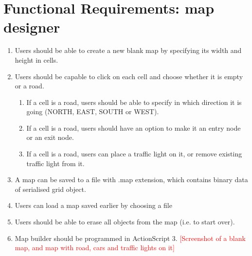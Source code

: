 \documentclass[]{article}
\begin{document}
\section*{Functional Requirements: map designer}
\begin{enumerate}
\item Users should be able to create a new blank map by specifying its width and height in cells. 
\item Users should be capable to click on each cell and choose whether it is empty or a road.
\begin{enumerate}
\item If a cell is a road, users should be able to specify in which direction it is going (NORTH, EAST, SOUTH or WEST).
\item If a cell is a road, users should have an option to make it an entry node or an exit node.
\item If a cell is a road, users can place a traffic light on it, or remove existing traffic light from it. 
\end{enumerate}
\item A map can be saved to a file with .map extension, which contains binary data of serialised grid object.
\item Users can load a map saved earlier by choosing a file \item  Users should be able to erase all objects from the map (i.e. to start over). 
\item Map builder should be programmed in ActionScript 3. 
\textcolor{red}{[Screenshot of a blank map, and map with road, cars and traffic lights on it]}
\end{enumerate}
\end{document}

